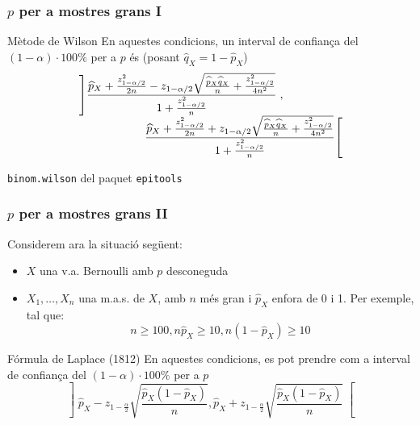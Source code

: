 \documentclass[12pt,t]{beamer}
\renewcommand{\geq}{\geqslant}
\theoremstyle{plain}
\theoremstyle{definition}
\begin{document}
\begin{frame}
\frametitle{$p$ per a mostres grans I}
\begin{block}{Mètode de Wilson}
En aquestes condicions, un interval  de confiança del $(1-\alpha)\cdot 100\%$ per a $p$
és  (posant $\widehat{q}_{X}=1-\widehat{p}_{X}$)
$$
\begin{array}{l}
\displaystyle \left]\frac{\widehat{p}_{X}+\frac{z_{1-{\alpha}/{2}}^2}{2n}-z_{1-{\alpha}/{2}}\sqrt{\frac{\widehat{p}_{X}\widehat{q}_{X}}{n}+\frac{z_{1-{\alpha}/{2}}^2}{4n^2}}}{1+\frac{z_{1-{\alpha}/{2}}^2}{n}}\right.,\\[2ex]
\hspace*{2cm} \displaystyle \left.\frac{\widehat{p}_{X}+\frac{z_{1-{\alpha}/{2}}^2}{2n}+z_{1-{\alpha}/{2}}\sqrt{\frac{\widehat{p}_{X}\widehat{q}_{X}}{n}+\frac{z_{1-{\alpha}/{2}}^2}{4n^2}}}{1+\frac{z_{1-{\alpha}/{2}}^2}{n}}\right[
\end{array}
$$
\end{block}
\medskip

\texttt{binom.wilson} del paquet \texttt{epitools}
\end{frame}



\begin{frame}
\frametitle{$p$ per a mostres grans II}

Considerem ara la situació següent:
\begin{itemize}
\item  $X$ una v.a. Bernoulli amb $p$ desconeguda

\item $X_1,\ldots,X_n$ una m.a.s. de $X$, amb $n$ més gran i $\widehat{p}_{X}$ enfora de 0 i 1. Per exemple, tal que:
$$
n\geq 100, n\widehat{p}_{X}\geq 10,  n(1-\widehat{p}_{X})\geq 10
$$
\end{itemize}
\medskip



\begin{block}{Fórmula de Laplace (1812)}
En aquestes condicions, es pot prendre com a interval  de confiança del $(1-\alpha)\cdot 100\%$ per a $p$
$$
\left]\widehat{p}_{X}-z_{1-\frac{\alpha}{2}}\sqrt{\frac{\widehat{p}_{X}
(1-\widehat{p}_{X})}{n}},
\widehat{p}_{X}+z_{1-\frac{\alpha}{2}}\sqrt{\frac{\widehat{p}_{X}
(1-\widehat{p}_{X})}{n}}\right[$$
\end{block}
\end{frame}
\end{document}
